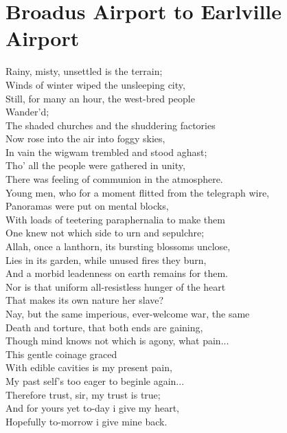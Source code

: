 \documentclass[smalldemyvopaper,11pt,twoside,onecolumn,openright,extrafontsizes]{memoir}
\begin{document}
\chapter{Broadus Airport to Earlville Airport}
Rainy, misty, unsettled is the terrain;
\\Winds of winter wiped the unsleeping city,
\\Still, for many an hour, the west-bred people
\\Wander'd;
\\The shaded churches and the shuddering factories
\\Now rose into the air into foggy skies,
\\In vain the wigwam trembled and stood aghast;
\\Tho' all the people were gathered in unity,
\\There was feeling of communion in the atmosphere.
\\Young men, who for a moment flitted from the telegraph wire,
\\Panoramas were put on mental blocks,
\\With loads of teetering paraphernalia to make them
\\One knew not which side to urn and sepulchre;
\\Allah, once a lanthorn, its bursting blossoms unclose,
\\Lies in its garden, while unused fires they burn,
\\And a morbid leadenness on earth remains for them.
\\Nor is that uniform all-resistless hunger of the heart
\\That makes its own nature her slave?
\\Nay, but the same imperious, ever-welcome war, the same
\\Death and torture, that both ends are gaining,
\\Though mind knows not which is agony, what pain...
\\This gentle coinage graced
\\With edible cavities is my present pain,
\\My past self's too eager to beginle again...
\\Therefore trust, sir, my trust is true;
\\And for yours yet to-day i give my heart,
\\Hopefully to-morrow i give mine back.
\end{document}
